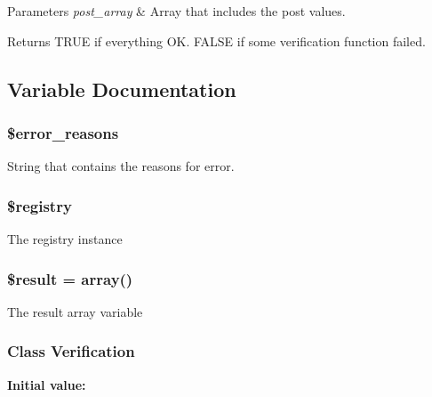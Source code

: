 \begin{DoxyParams}{Parameters}
{\em post\-\_\-array} & Array that includes the post values.\\
\hline
\end{DoxyParams}
\begin{DoxyReturn}{Returns}
T\-R\-U\-E if everything O\-K. F\-A\-L\-S\-E if some verification function failed. 
\end{DoxyReturn}


\subsection{Variable Documentation}
\hypertarget{verification_8php_a90a4d28b2cb5de073936de187b621453}{
\subsubsection[{\$error\-\_\-reasons}]{\setlength{\rightskip}{0pt plus 5cm}\$error\-\_\-reasons}}\label{verification_8php_a90a4d28b2cb5de073936de187b621453}
String that contains the reasons for error. \hypertarget{verification_8php_a531e4a386aaa7f3e06d3642dc38d7e80}{
\subsubsection[{\$registry}]{\setlength{\rightskip}{0pt plus 5cm}\$registry}}\label{verification_8php_a531e4a386aaa7f3e06d3642dc38d7e80}
The registry instance \hypertarget{verification_8php_a112ef069ddc0454086e3d1e6d8d55d07}{
\subsubsection[{\$result}]{\setlength{\rightskip}{0pt plus 5cm}\$result = array()}}\label{verification_8php_a112ef069ddc0454086e3d1e6d8d55d07}
The result array variable \hypertarget{verification_8php_ae087d6118933ecf9a05f114d6808b973}{
\subsubsection[{Verification}]{\setlength{\rightskip}{0pt plus 5cm}Class {\bf Verification}}}\label{verification_8php_ae087d6118933ecf9a05f114d6808b973}
{\bfseries Initial value\-:}
